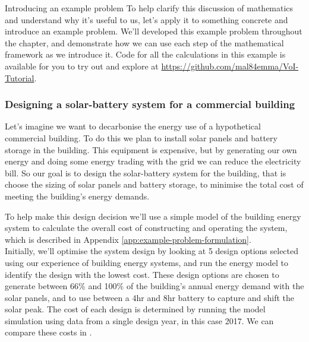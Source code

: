 \begin{ebox}[label=ebox:opt]{Introducing an example problem}
    To help clarify this discussion of mathematics and understand why it's useful to us, let's apply it to something concrete and introduce an example problem. We'll developed this example problem throughout the chapter, and demonstrate how we can use each step of the mathematical framework as we introduce it. Code for all the calculations in this example is available for you to try out and explore at \url{https://github.com/mal84emma/VoI-Tutorial}.

    \subsubsection*{Designing a solar-battery system for a commercial building}
    \vspace*{-1ex}
    Let's imagine we want to decarbonise the energy use of a hypothetical commercial building. To do this we plan to install solar panels and battery storage in the building. This equipment is expensive, but by generating our own energy and doing some energy trading with the grid we can reduce the electricity bill. So our goal is to design the solar-battery system for the building, that is choose the sizing of solar panels and battery storage, to minimise the total cost of meeting the building's energy demands.

    To help make this design decision we'll use a simple model of the building energy system to calculate the overall cost of constructing and operating the system, which is described in Appendix \ref{app:example-problem-formulation}.\\

    Initially, we'll optimise the system design by looking at 5 design options selected using our experience of building energy systems, and run the energy model to identify the design with the lowest cost. These design options are chosen to generate between 66\% and 100\% of the building's annual energy demand with the solar panels, and to use between a 4hr and 8hr battery to capture and shift the solar peak. The cost of each design is determined by running the model simulation using data from a single design year, in this case 2017. We can compare these costs in .\\


\end{ebox}

